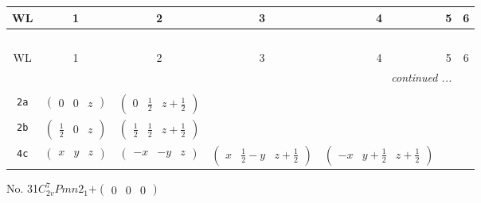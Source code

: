 \documentclass[fleqn,9pt,landscape]{jsarticle}
\begin{document}
\begin{center}
\renewcommand{\arraystretch}{1.2}
\begin{longtable}{ccccccc}
 \hline \hline
WL & 1 & 2 & 3 & 4 & 5 & 6 \\ \hline \endfirsthead

\multicolumn{6}{l}{\tablename\ \thetable{}} \\
 \hline \hline
WL & 1 & 2 & 3 & 4 & 5 & 6 \\ \hline \endhead

 \hline \hline
\multicolumn{6}{r}{\footnotesize\it continued ...} \\ \endfoot

 \hline \hline
\multicolumn{6}{r}{} \\ \endlastfoot

{\tt 2a} & $ \begin{pmatrix} 0 & 0 & z \end{pmatrix} $ & $ \begin{pmatrix} 0 & \frac{1}{2} & z + \frac{1}{2} \end{pmatrix} $ & $  $ & $  $ \\ \hline
{\tt 2b} & $ \begin{pmatrix} \frac{1}{2} & 0 & z \end{pmatrix} $ & $ \begin{pmatrix} \frac{1}{2} & \frac{1}{2} & z + \frac{1}{2} \end{pmatrix} $ & $  $ & $  $ \\ \hline
{\tt 4c} & $ \begin{pmatrix} x & y & z \end{pmatrix} $ & $ \begin{pmatrix} - x & - y & z \end{pmatrix} $ & $ \begin{pmatrix} x & \frac{1}{2} - y & z + \frac{1}{2} \end{pmatrix} $ & $ \begin{pmatrix} - x & y + \frac{1}{2} & z + \frac{1}{2} \end{pmatrix} $ \\
\end{longtable}
\end{center}
\newpage
No. 31\quad$C_{2v}^{7}$\quad$Pmn2_1$\quad[ orthorhombic ]\quad$+\begin{pmatrix} 0 & 0 & 0 \end{pmatrix}$
\end{document}
